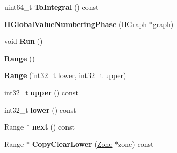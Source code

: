 \begin{DoxyCompactItemize}
\item 
\hypertarget{classv8_1_1internal_1_1_v8___f_i_n_a_l_aa923f45679cbdd1b5f314df45ef3d502}{}uint64\+\_\+t {\bfseries To\+Integral} () const \label{classv8_1_1internal_1_1_v8___f_i_n_a_l_aa923f45679cbdd1b5f314df45ef3d502}

\item 
\hypertarget{classv8_1_1internal_1_1_v8___f_i_n_a_l_ad21fb7663abc19d30a36eea98437840b}{}{\bfseries H\+Global\+Value\+Numbering\+Phase} (H\+Graph $\ast$graph)\label{classv8_1_1internal_1_1_v8___f_i_n_a_l_ad21fb7663abc19d30a36eea98437840b}

\item 
\hypertarget{classv8_1_1internal_1_1_v8___f_i_n_a_l_a6b8ceb545691b3389cb68a2156539f25}{}void {\bfseries Run} ()\label{classv8_1_1internal_1_1_v8___f_i_n_a_l_a6b8ceb545691b3389cb68a2156539f25}

\item 
\hypertarget{classv8_1_1internal_1_1_v8___f_i_n_a_l_a8e3677c16a1538c3b63f0a6eb493e957}{}{\bfseries Range} ()\label{classv8_1_1internal_1_1_v8___f_i_n_a_l_a8e3677c16a1538c3b63f0a6eb493e957}

\item 
\hypertarget{classv8_1_1internal_1_1_v8___f_i_n_a_l_a548e8c1d52c810cebc8274517ff46fab}{}{\bfseries Range} (int32\+\_\+t lower, int32\+\_\+t upper)\label{classv8_1_1internal_1_1_v8___f_i_n_a_l_a548e8c1d52c810cebc8274517ff46fab}

\item 
\hypertarget{classv8_1_1internal_1_1_v8___f_i_n_a_l_afce3058fb16c220d2be7999561199c5a}{}int32\+\_\+t {\bfseries upper} () const \label{classv8_1_1internal_1_1_v8___f_i_n_a_l_afce3058fb16c220d2be7999561199c5a}

\item 
\hypertarget{classv8_1_1internal_1_1_v8___f_i_n_a_l_a56121ef60f6fb4a1837d61f54ef3a201}{}int32\+\_\+t {\bfseries lower} () const \label{classv8_1_1internal_1_1_v8___f_i_n_a_l_a56121ef60f6fb4a1837d61f54ef3a201}

\item 
\hypertarget{classv8_1_1internal_1_1_v8___f_i_n_a_l_a14e7ecd762b934467a15d7f37b718b01}{}Range $\ast$ {\bfseries next} () const \label{classv8_1_1internal_1_1_v8___f_i_n_a_l_a14e7ecd762b934467a15d7f37b718b01}

\item 
\hypertarget{classv8_1_1internal_1_1_v8___f_i_n_a_l_ab513ec59fbacb97945261ac76cd6b9d1}{}Range $\ast$ {\bfseries Copy\+Clear\+Lower} (\hyperlink{classv8_1_1internal_1_1_zone}{Zone} $\ast$zone) const \label{classv8_1_1internal_1_1_v8___f_i_n_a_l_ab513ec59fbacb97945261ac76cd6b9d1}


\end{DoxyCompactItemize}
